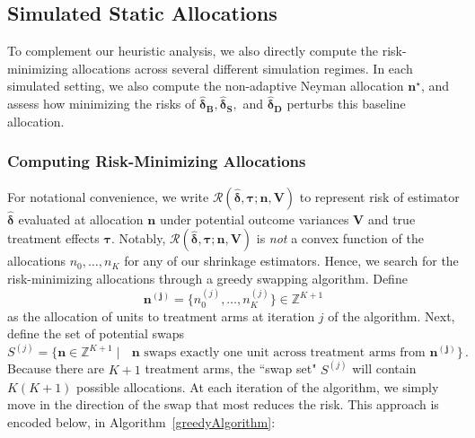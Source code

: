 \documentclass{article}
\newcommand{\bstau}{\boldsymbol \tau}
\newcommand{\bsn}{\boldsymbol n}
\newcommand{\bsdeltad}{\boldsymbol{\hat \delta_{\textbf{D}}}}
\newcommand{\bsdelt}{\boldsymbol{\hat \delta}}
\newcommand{\bsdeltb}{\boldsymbol {\hat \delta_B}}
\newcommand{\bsdelts}{\boldsymbol {\hat \delta_S}}
\begin{document}
\subsection{Simulated Static Allocations}\label{sec:nonadaptSim}

To complement our heuristic analysis, we also directly compute the risk-minimizing allocations across several different simulation regimes. In each simulated setting, we also compute the non-adaptive Neyman allocation $\boldsymbol n^\star$, and assess how minimizing the risks of $\bsdeltb, \bsdelts,$ and $\bsdeltad$ perturbs this baseline allocation.


\subsubsection{Computing Risk-Minimizing Allocations}

For notational convenience, we write $\mathcal R(\bsdelt, \bstau ; \bsn,\boldsymbol V)$ to represent risk of estimator $\bsdelt$ evaluated at allocation $\bsn$ under potential outcome variances $\boldsymbol{V}$ and true treatment effects $\bstau$. Notably, $\mathcal R(\bsdelt, \bstau ; \bsn,\boldsymbol V)$
is \emph{not} a convex function of the allocations $n_0, \dots, n_K$ for any of our shrinkage estimators. Hence, we search for the risk-minimizing allocations through a greedy swapping algorithm. Define
\[ \boldsymbol{n^{(j)}} = \{ n_{0}^{(j)}, \dots, n_{K}^{(j)}\} \in \mathbb{Z}^{K +1} \] 
as the allocation of units to treatment arms at iteration $j$ of the algorithm. Next, define the set of potential swaps
\[ S^{(j)} = \{ \boldsymbol n \in \mathbb{Z}^{K + 1} \mid \text{ $\boldsymbol n$ swaps exactly one unit across treatment arms from } \boldsymbol{n^{(j)}} \}\,. \] 
Because there are $K + 1$ treatment arms, the ``swap set" $S^{(j)} $ will contain $K(K+1)$ possible allocations. At each iteration of the algorithm, we simply move in the direction of the swap that most reduces the risk. This approach is encoded below, in Algorithm~\ref{greedyAlgorithm}:
\end{document}
